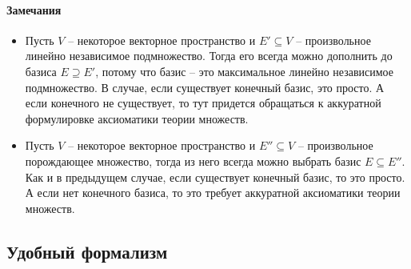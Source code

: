 \paragraph{Замечания}

\begin{itemize}
\item Пусть $V$ -- некоторое векторное пространство и $E'\subseteq V$ -- произвольное линейно независимое подмножество.
Тогда его всегда можно дополнить до базиса $E \supseteq E'$, потому что базис -- это максимальное линейно независимое подмножество.
В случае, если существует конечный базис, это просто.
А если конечного не существует, то тут придется обращаться к аккуратной формулировке аксиоматики теории множеств.

\item Пусть $V$ -- некоторое векторное пространство и $E''\subseteq V$ -- произвольное порождающее множество, тогда из него всегда можно выбрать базис $E\subseteq E''$.
Как и в предыдущем случае, если существует конечный базис, то это просто.
А если нет конечного базиса, то это требует аккуратной аксиоматики теории множеств.
\end{itemize}



\subsection{Удобный формализм}

